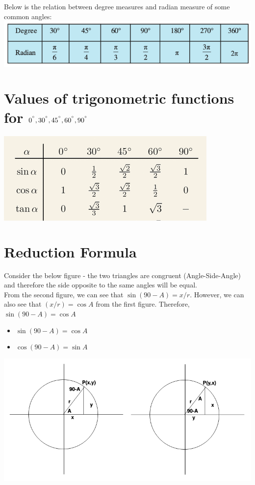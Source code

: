 \documentclass{book}
\begin{document}
	 Below is the relation between degree measures and radian measure of some common angles: \\
	 
	 \includegraphics[scale=0.6]{raddegree}
	 
	 \section{Values of trigonometric functions for $0^{\degree}, 30^{\degree}, 45^{\degree},60^{\degree},90^{\degree}$}
	 
	 \includegraphics[scale=0.6]{values} \\
	
	\section{Reduction Formula}
	
	Consider the below figure - the two triangles are congruent (Angle-Side-Angle) and therefore the side opposite to the same angles will be equal.\\
	From the second figure, we can see that $\sin(90-A) = {x/r}$. However, we can also see that $(x/r)= \cos{A}$ from the first figure. Therefore, $\sin{(90-A)}= \cos{A}$
	\begin{mdframed}[backgroundcolor=yellow]
		\begin{itemize}
			\item$\sin(90-A) = \cos{A}$
			\item $\cos(90-A) = \sin{A}$
			
		\end{itemize}
	\end{mdframed}
	
	\includegraphics[scale=0.6]{compangle} \\
	
\end{document}
